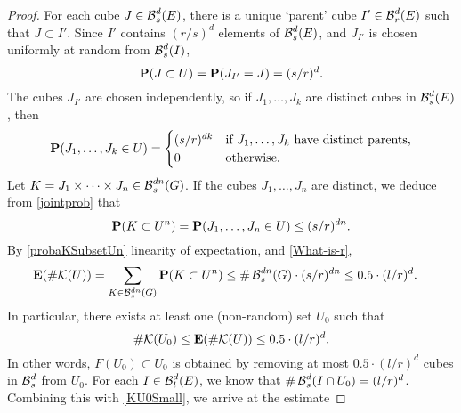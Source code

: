 \begin{proof}
	For each cube $J \in \operatorname{\mathcal{B}}_s^d(E)$, there is a unique `parent' cube $I' \in \operatorname{\mathcal{B}}_r^d(E)$ such that $J \subset I'$. Since $I'$ contains $(r/s)^d$ elements of $\operatorname{\mathcal{B}}^d_s(E)$, and $J_{I'}$ is chosen uniformly at random from $\operatorname{\mathcal{B}}^d_s(I)$,
	\[ \operatorname{\mathbf{P}}(J \subset U) = \operatorname{\mathbf{P}}(J_{I'} = J) = (s/r)^d. \]
	The cubes $J_{I'}$ are chosen independently, so if $J_1, \dots, J_k$ are distinct cubes in $\operatorname{\mathcal{B}}^d_s(E)$, then %
	\begin{equation}\label{jointprob}
	\operatorname{\mathbf{P}}(J_1, \dots, J_k \in U) = \begin{cases} (s/r)^{dk} & \text{if $J_1, \dots, J_k$ have distinct parents,} \\ 0 & \text{otherwise}. \end{cases} 
	\end{equation}
	Let $K = J_1 \times \dots \times J_n \in \operatorname{\mathcal{B}}^{dn}_s(G)$. If the cubes $J_1, \dots, J_n$ are distinct, we deduce from \eqref{jointprob} that
	\begin{equation}\label{probaKSubsetUn}
		\operatorname{\mathbf{P}}(K \subset U^n) = \operatorname{\mathbf{P}}(J_1, \dots, J_n \in U) \leq (s/r)^{dn}.
	\end{equation}
	By \eqref{probaKSubsetUn} linearity of expectation, and \eqref{What-is-r},
	\begin{align*}
		\operatorname{\mathbf{E}}(\# \mathcal{K}(U)) &= \sum_{K \in \operatorname{\mathcal{B}}^{dn}_s(G)} \operatorname{\mathbf{P}}(K \subset U^n) \leq \# \operatorname{\mathcal{B}}_s^{dn}(G) \cdot (s/r)^{dn}
		\leq 0.5 \cdot (l/r)^d.
	\end{align*}
	In particular, there exists at least one (non-random) set $U_0$ such that
	\begin{equation}\label{KU0Small}
		\# \mathcal{K}(U_0) \leq \operatorname{\mathbf{E}}(\# \mathcal{K}(U)) \leq 0.5 \cdot (l/r)^d.
	\end{equation}
	 In other words, $F(U_0) \subset U_0$ is obtained by removing at most $0.5 \cdot (l/r)^d$ cubes in $\operatorname{\mathcal{B}}^d_s$ from $U_0$. For each $I \in \operatorname{\mathcal{B}}_l^d(E)$, we know that $\# \operatorname{\mathcal{B}}_{s}^d(I \cap U_0) = (l/r)^d$. Combining this with \eqref{KU0Small}, we arrive at the estimate 

\end{proof}
